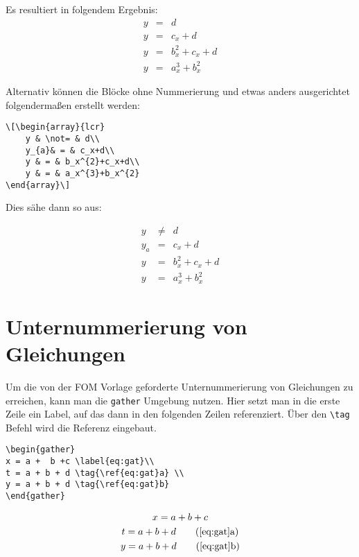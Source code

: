 Es resultiert in folgendem Ergebnis:
\begin{eqnarray}
    y & = & d\\
    y & = & c_x+d\\
    y & = & b_x^{2}+c_x+d\\
    y & = & a_x^{3}+b_x^{2}
\end{eqnarray}

Alternativ können die Blöcke ohne Nummerierung und etwas anders ausgerichtet folgendermaßen erstellt werden:
\begin{lstlisting}
\[\begin{array}{lcr}
    y & \not= & d\\
    y_{a}& = & c_x+d\\
    y & = & b_x^{2}+c_x+d\\
    y & = & a_x^{3}+b_x^{2}
\end{array}\]
\end{lstlisting}

Dies sähe dann so aus:

\[\begin{array}{lcr}
    y & \not= & d\\
    y_{a}& = & c_x+d\\
    y & = & b_x^{2}+c_x+d\\
    y & = & a_x^{3}+b_x^{2}
\end{array}\]

\section{Unternummerierung von Gleichungen}

Um die von der FOM Vorlage geforderte Unternummerierung von Gleichungen zu erreichen, kann man die \texttt{gather} Umgebung nutzen. Hier setzt man in die erste Zeile ein Label, auf das dann in den folgenden Zeilen referenziert. Über den \texttt{\textbackslash tag} Befehl wird die Referenz eingebaut.


\begin{lstlisting}
\begin{gather}
x = a +  b +c \label{eq:gat}\\
t = a + b + d \tag{\ref{eq:gat}a} \\
y = a + b + d \tag{\ref{eq:gat}b}
\end{gather}
\end{lstlisting}


\begin{gather}
x = a +  b +c \label{eq:gat}\\
t = a + b + d \tag{\ref{eq:gat}a} \\
y = a + b + d \tag{\ref{eq:gat}b}
\end{gather}



